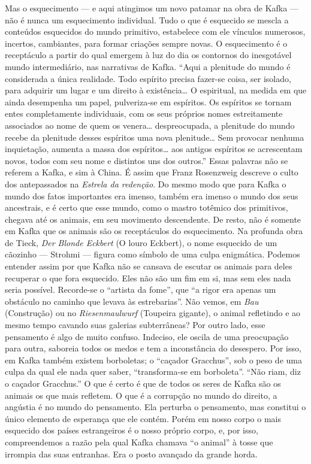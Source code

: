 Mas o esquecimento --- e aqui atingimos um novo patamar na obra de Kafka
--- não é nunca um esquecimento individual. Tudo o que é esquecido se
mescla a conteúdos esquecidos do mundo primitivo, estabelece com ele
vínculos numerosos, incertos, cambiantes, para formar criações sempre
novas. O esquecimento é o receptáculo a partir do qual emergem à luz do
dia os contornos do inesgotável mundo intermediário, nas narrativas de
Kafka. ``Aqui a plenitude do mundo é considerada a única realidade. Todo
espírito precisa fazer-se coisa, ser isolado, para adquirir um lugar e
um direito à existência\ldots{} O espiritual, na medida em que ainda
desempenha um papel, pulveriza-se em espíritos. Os espíritos se tornam
entes completamente individuais, com os seus próprios nomes
estreitamente associados ao nome de quem os venera\ldots{} despreocupada, a
plenitude do mundo recebe da plenitude desses espíritos uma nova
plenitude\ldots{} Sem provocar nenhuma inquietação, aumenta a massa dos
espíritos\ldots{} aos antigos espíritos se acrescentam novos, todos com seu
nome e distintos uns dos outros.'' Essas palavras não se referem a
Kafka, e sim à China. É assim que Franz Rosenzweig descreve o culto dos
antepassados na \textit{Estrela da redenção}. Do mesmo modo que para Kafka o
mundo dos fatos importantes era imenso, também era imenso o mundo dos
seus ancestrais, e é certo que esse mundo, como o mastro totêmico dos
primitivos, chegava até os animais, em seu movimento descendente. De
resto, não é somente em Kafka que os animais são os receptáculos do
esquecimento. Na profunda obra de Tieck, \textit{Der Blonde Eckbert} (O louro
Eckbert), o nome esquecido de um cãozinho --- Strohmi --- figura como
símbolo de uma culpa enigmática. Podemos entender assim por que Kafka
não se cansava de escutar os animais para deles recuperar o que fora
esquecido. Eles não são um fim em si, mas sem eles nada seria possível.
Recorde-se o ``artista da fome'', que ``a rigor era apenas um obstáculo
no caminho que levava às estrebarias''. Não vemos, em \textit{Bau}
(Construção) ou no \textit{Riesenmaulwurf} (Toupeira gigante), o animal
refletindo e ao mesmo tempo cavando suas galerias subterrâneas? Por
outro lado, esse pensamento é algo de muito confuso. Indeciso, ele
oscila de uma preocupação para outra, saboreia todos os medos e tem a
inconstância do desespero. Por isso, em Kafka também existem borboletas;
o ``caçador Gracchus'', sob o peso de uma culpa da qual ele nada quer
saber, ``transforma-se em borboleta''. ``Não riam, diz o caçador
Gracchus.'' O que é certo é que de todos os seres de Kafka são os
animais os que mais refletem. O que é a corrupção no mundo do direito, a
angústia é no mundo do pensamento. Ela perturba o pensamento, mas
constitui o único elemento de esperança que ele contém. Porém em nosso
corpo o mais esquecido dos países estrangeiros é o nosso próprio corpo,
e, por isso, compreendemos a razão pela qual Kafka chamava ``o animal''
à tosse que irrompia das suas entranhas. Era o posto avançado da grande
horda.

